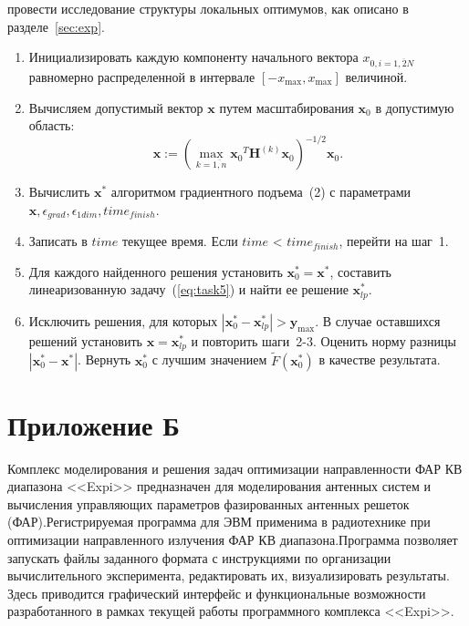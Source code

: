  провести исследование структуры локальных оптимумов, как описано в разделе~\ref{sec:exp}.\\

\begin{enumerate}
  \item Инициализировать каждую компоненту начального вектора $x_{0,i = \overline{1,2N}}$ равномерно распределенной в интервале $[-x_{\max}, x_{\max}]$
  величиной.
  \item Вычисляем допустимый вектор $\textbf{x}$ путем масштабирования $\textbf{x}_0$ в допустимую область:
  $$\textbf{x} := (\max_{k=\overline{1,n}} {\textbf{x}_0}^T \textbf{H}^{(k)}{\textbf{x}_0})^{-1/2} {\textbf{x}_0}.$$
  \item Вычислить ${\textbf{x}^{*}}$ алгоритмом градиентного подъема~(2) с параметрами ${\textbf{x}}, \epsilon_{grad}, \epsilon_{1dim}, time_{finish}.$
  \item Записать в $time$ текущее время. Если $time$ < $time_{finish}$, перейти на шаг~1.
  \item Для каждого найденного решения установить ${\textbf{x}_0^{*}} = {\textbf{x}^{*}}$, составить линеаризованную задачу~(\ref{eq:task5}) и найти
  ее решение ${\textbf{x}_{lp}^{*}}$.
  \item Исключить решения, для которых $|{\textbf{x}_0^{*}} - {\textbf{x}_{lp}^{*}}| > {\textbf{y}_{\max}}$. В случае оставшихся решений установить
  $\textbf{x} = {\textbf{x}_{lp}^{*}}$ и повторить шаги~2-3. Оценить норму разницы $|{\textbf{x}_0^{*}} - {\textbf{x}^{*}}|$. Вернуть ${\textbf{x}_0^{*}}$ с
  лучшим значением $\tilde{F}({\textbf{x}_0^{*}})$ в качестве результата.
\end{enumerate}

\section*{Приложение Б}
\label{sec:applic_b}
Комплекс моделирования и решения задач оптимизации направленности ФАР КВ диапазона <<Expi>> предназначен для моделирования антенных систем и вычисления управляющих параметров фазированных антенных решеток (ФАР).Регистрируемая программа для ЭВМ применима в радиотехнике
при оптимизации направленного излучения ФАР КВ диапазона.Программа позволяет запускать файлы заданного формата с инструкциями по организации вычислительного эксперимента, редактировать их, визуализировать результаты.
Здесь приводится графический интерфейс и функциональные возможности разработанного в рамках текущей работы программного комплекса <<Expi>>.

